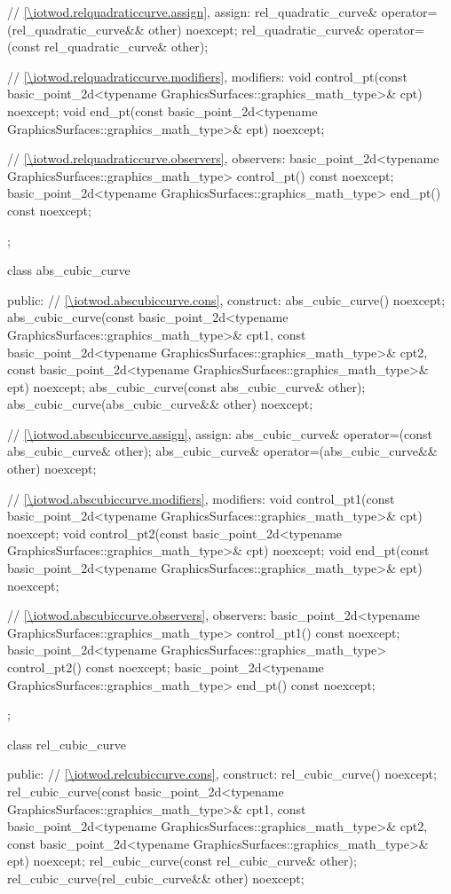 \begin{codeblock}
{{{      // \ref{\iotwod.relquadraticcurve.assign}, assign:
      rel_quadratic_curve& operator=(rel_quadratic_curve&& other) noexcept;
      rel_quadratic_curve& operator=(const rel_quadratic_curve& other);

      // \ref{\iotwod.relquadraticcurve.modifiers}, modifiers:
      void control_pt(const basic_point_2d<typename
        GraphicsSurfaces::graphics_math_type>& cpt) noexcept;
      void end_pt(const basic_point_2d<typename
        GraphicsSurfaces::graphics_math_type>& ept) noexcept;

      // \ref{\iotwod.relquadraticcurve.observers}, observers:
      basic_point_2d<typename GraphicsSurfaces::graphics_math_type> control_pt() const noexcept;
      basic_point_2d<typename GraphicsSurfaces::graphics_math_type> end_pt() const noexcept;
    };

    class abs_cubic_curve {
    public:
      // \ref{\iotwod.abscubiccurve.cons}, construct:
      abs_cubic_curve() noexcept;
      abs_cubic_curve(const basic_point_2d<typename GraphicsSurfaces::graphics_math_type>& cpt1,
        const basic_point_2d<typename GraphicsSurfaces::graphics_math_type>& cpt2,
        const basic_point_2d<typename GraphicsSurfaces::graphics_math_type>& ept) noexcept;
      abs_cubic_curve(const abs_cubic_curve& other);
      abs_cubic_curve(abs_cubic_curve&& other) noexcept;

      // \ref{\iotwod.abscubiccurve.assign}, assign:
      abs_cubic_curve& operator=(const abs_cubic_curve& other);
      abs_cubic_curve& operator=(abs_cubic_curve&& other) noexcept;

      // \ref{\iotwod.abscubiccurve.modifiers}, modifiers:
      void control_pt1(const basic_point_2d<typename
        GraphicsSurfaces::graphics_math_type>& cpt) noexcept;
      void control_pt2(const basic_point_2d<typename
        GraphicsSurfaces::graphics_math_type>& cpt) noexcept;
      void end_pt(const basic_point_2d<typename
        GraphicsSurfaces::graphics_math_type>& ept) noexcept;

      // \ref{\iotwod.abscubiccurve.observers}, observers:
      basic_point_2d<typename GraphicsSurfaces::graphics_math_type> control_pt1() const noexcept;
      basic_point_2d<typename GraphicsSurfaces::graphics_math_type> control_pt2() const noexcept;
      basic_point_2d<typename GraphicsSurfaces::graphics_math_type> end_pt() const noexcept;
    };

    class rel_cubic_curve {
    public:
      // \ref{\iotwod.relcubiccurve.cons}, construct:
      rel_cubic_curve() noexcept;
      rel_cubic_curve(const basic_point_2d<typename GraphicsSurfaces::graphics_math_type>& cpt1,
      const basic_point_2d<typename GraphicsSurfaces::graphics_math_type>& cpt2,
      const basic_point_2d<typename GraphicsSurfaces::graphics_math_type>& ept) noexcept;
      rel_cubic_curve(const rel_cubic_curve& other);
      rel_cubic_curve(rel_cubic_curve&& other) noexcept;

}}}
\end{codeblock}
